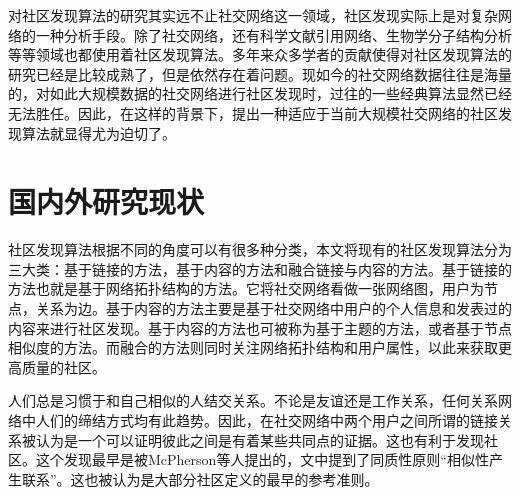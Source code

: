 对社区发现算法的研究其实远不止社交网络这一领域，社区发现实际上是对复杂网络的一种分析手段。除了社交网络，还有科学文献引用网络、生物学分子结构分析等等领域也都使用着社区发现算法。多年来众多学者的贡献使得对社区发现算法的研究已经是比较成熟了，但是依然存在着问题。现如今的社交网络数据往往是海量的，对如此大规模数据的社交网络进行社区发现时，过往的一些经典算法显然已经无法胜任。因此，在这样的背景下，提出一种适应于当前大规模社交网络的社区发现算法就显得尤为迫切了。

\section{国内外研究现状}

社区发现算法根据不同的角度可以有很多种分类，本文将现有的社区发现算法分为三大类：基于链接的方法，基于内容的方法和融合链接与内容的方法。基于链接的方法也就是基于网络拓扑结构的方法。它将社交网络看做一张网络图，用户为节点，关系为边。基于内容的方法主要是基于社交网络中用户的个人信息和发表过的内容来进行社区发现。基于内容的方法也可被称为基于主题的方法，或者基于节点相似度的方法。而融合的方法则同时关注网络拓扑结构和用户属性，以此来获取更高质量的社区。


人们总是习惯于和自己相似的人结交关系。不论是友谊还是工作关系，任何关系网络中人们的缔结方式均有此趋势。因此，在社交网络中两个用户之间所谓的链接关系被认为是一个可以证明彼此之间是有着某些共同点的证据。这也有利于发现社区。这个发现最早是被McPherson等人\cite{Mcpherson2001Birds}提出的，文中提到了同质性原则“相似性产生联系”。这也被认为是大部分社区定义的最早的参考准则。

